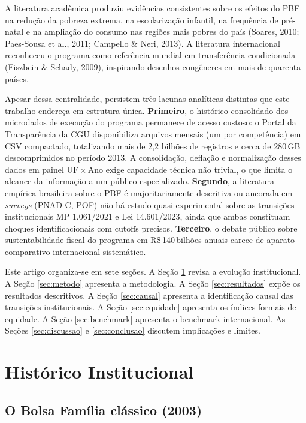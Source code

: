 \documentclass[12pt,a4paper,oneside]{article}
\newcommand{\rs}{R\$\,}
\begin{document}
A literatura acadêmica produziu evidências consistentes sobre os
efeitos do PBF na redução da pobreza extrema, na escolarização
infantil, na frequência de pré-natal e na ampliação do consumo nas
regiões mais pobres do país (Soares, 2010; Paes-Sousa et al., 2011; Campello \& Neri, 2013). A literatura internacional reconheceu o
programa como referência mundial em transferência
condicionada (Fiszbein \& Schady, 2009), inspirando desenhos congêneres
em mais de quarenta países.

Apesar dessa centralidade, persistem três lacunas analíticas
distintas que este trabalho endereça em estrutura única.
\textbf{Primeiro}, o histórico consolidado dos microdados de
execução do programa permanece de acesso custoso: o Portal da
Transparência da CGU disponibiliza arquivos mensais (um por
competência) em CSV compactado, totalizando mais de 2,2 bilhões de
registros e cerca de 280\,GB descomprimidos no período
2013. A consolidação, deflação e normalização
desses dados em painel UF\,$\times$\,Ano exige capacidade técnica
não trivial, o que limita o alcance da informação a um público
especializado. \textbf{Segundo}, a literatura empírica brasileira
sobre o PBF é majoritariamente descritiva ou ancorada em
\textit{surveys} (PNAD-C, POF) \textemdash{} não há estudo
quasi-experimental sobre as transições institucionais MP 1.061/2021
e Lei 14.601/2023, ainda que ambas constituam choques
identificacionais com cutoffs precisos. \textbf{Terceiro}, o debate
público sobre sustentabilidade fiscal do programa em \rs 140\,bilhões
anuais carece de aparato comparativo internacional sistemático.

Este artigo organiza-se em sete seções. A Seção
\ref{sec:teoria} revisa a evolução institucional. A Seção
\ref{sec:metodo} apresenta a metodologia. A Seção
\ref{sec:resultados} expõe os resultados descritivos. A Seção
\ref{sec:causal} apresenta a identificação causal das transições
institucionais. A Seção \ref{sec:equidade} apresenta os índices
formais de equidade. A Seção \ref{sec:benchmark} apresenta o
benchmark internacional. As Seções \ref{sec:discussao} e
\ref{sec:conclusao} discutem implicações e limites.


\section{Histórico Institucional}\label{sec:teoria}


\subsection{O Bolsa Família clássico (2003)}
\end{document}
